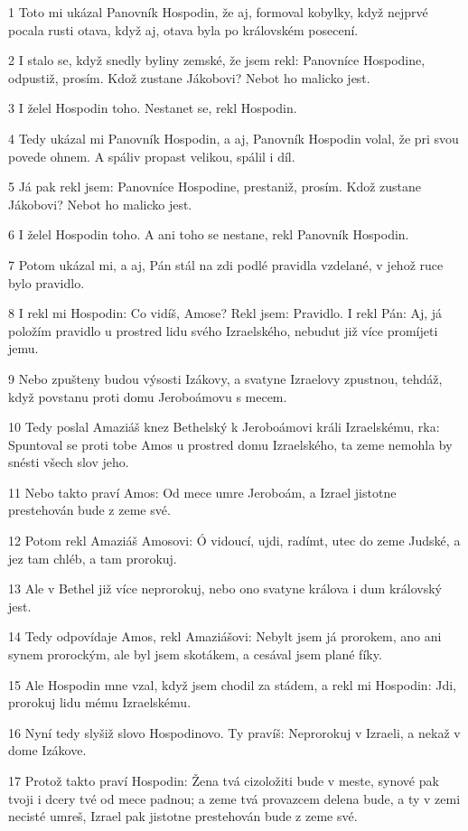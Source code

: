 \par 1 Toto mi ukázal Panovník Hospodin, že aj, formoval kobylky, když nejprvé pocala rusti otava, když aj, otava byla po královském posecení.
\par 2 I stalo se, když snedly byliny zemské, že jsem rekl: Panovníce Hospodine, odpustiž, prosím. Kdož zustane Jákobovi? Nebot ho malicko jest.
\par 3 I želel Hospodin toho. Nestanet se, rekl Hospodin.
\par 4 Tedy ukázal mi Panovník Hospodin, a aj, Panovník Hospodin volal, že pri svou povede ohnem. A spáliv propast velikou, spálil i díl.
\par 5 Já pak rekl jsem: Panovníce Hospodine, prestaniž, prosím. Kdož zustane Jákobovi? Nebot ho malicko jest.
\par 6 I želel Hospodin toho. A ani toho se nestane, rekl Panovník Hospodin.
\par 7 Potom ukázal mi, a aj, Pán stál na zdi podlé pravidla vzdelané, v jehož ruce bylo pravidlo.
\par 8 I rekl mi Hospodin: Co vidíš, Amose? Rekl jsem: Pravidlo. I rekl Pán: Aj, já položím pravidlo u prostred lidu svého Izraelského, nebudut již více promíjeti jemu.
\par 9 Nebo zpušteny budou výsosti Izákovy, a svatyne Izraelovy zpustnou, tehdáž, když povstanu proti domu Jeroboámovu s mecem.
\par 10 Tedy poslal Amaziáš knez Bethelský k Jeroboámovi králi Izraelskému, rka: Spuntoval se proti tobe Amos u prostred domu Izraelského, ta zeme nemohla by snésti všech slov jeho.
\par 11 Nebo takto praví Amos: Od mece umre Jeroboám, a Izrael jistotne prestehován bude z zeme své.
\par 12 Potom rekl Amaziáš Amosovi: Ó vidoucí, ujdi, radímt, utec do zeme Judské, a jez tam chléb, a tam prorokuj.
\par 13 Ale v Bethel již více neprorokuj, nebo ono svatyne králova i dum královský jest.
\par 14 Tedy odpovídaje Amos, rekl Amaziášovi: Nebylt jsem já prorokem, ano ani synem prorockým, ale byl jsem skotákem, a cesával jsem plané fíky.
\par 15 Ale Hospodin mne vzal, když jsem chodil za stádem, a rekl mi Hospodin: Jdi, prorokuj lidu mému Izraelskému.
\par 16 Nyní tedy slyšiž slovo Hospodinovo. Ty pravíš: Neprorokuj v Izraeli, a nekaž v dome Izákove.
\par 17 Protož takto praví Hospodin: Žena tvá cizoložiti bude v meste, synové pak tvoji i dcery tvé od mece padnou; a zeme tvá provazcem delena bude, a ty v zemi necisté umreš, Izrael pak jistotne prestehován bude z zeme své.

